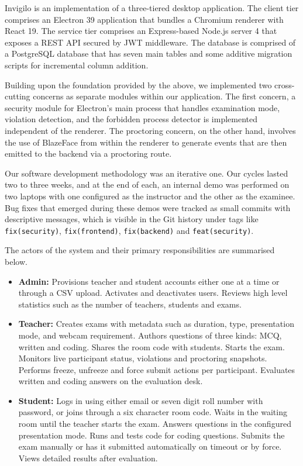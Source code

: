 \documentclass[12pt, a4paper]{report}
\begin{document}
\begin{justify}
  {\fontsize{12}{18}\selectfont
    Invigilo is an implementation of a three-tiered desktop application. The client tier comprises an Electron 39 application that bundles a Chromium renderer with React 19. The service tier comprises an Express-based Node.js server 4 that exposes a REST API secured by JWT middleware. The database is comprised of a PostgreSQL database that has seven main tables and some additive migration scripts for incremental column addition.

    Building upon the foundation provided by the above, we implemented two cross-cutting concerns as separate modules within our application. The first concern, a security module for Electron’s main process that handles examination mode, violation detection, and the forbidden process detector is implemented independent of the renderer. The proctoring concern, on the other hand, involves the use of BlazeFace from within the renderer to generate events that are then emitted to the backend via a proctoring route.

    Our software development methodology was an iterative one. Our cycles lasted two to three weeks, and at the end of each, an internal demo was performed on two laptops with one configured as the instructor and the other as the examinee. Bug fixes that emerged during these demos were tracked as small commits with descriptive messages, which is visible in the Git history under tags like \texttt{fix(security)}, \texttt{fix(frontend)}, \texttt{fix(backend)} and \texttt{feat(security)}.

    The actors of the system and their primary responsibilities are summarised below.

    \begin{itemize}
        \item \textbf{Admin:} Provisions teacher and student accounts either one at a time or through a CSV upload. Activates and deactivates users. Reviews high level statistics such as the number of teachers, students and exams.
        \item \textbf{Teacher:} Creates exams with metadata such as duration, type, presentation mode, and webcam requirement. Authors questions of three kinds: MCQ, written and coding. Shares the room code with students. Starts the exam. Monitors live participant status, violations and proctoring snapshots. Performs freeze, unfreeze and force submit actions per participant. Evaluates written and coding answers on the evaluation desk.
        \item \textbf{Student:} Logs in using either email or seven digit roll number with password, or joins through a six character room code. Waits in the waiting room until the teacher starts the exam. Answers questions in the configured presentation mode. Runs and tests code for coding questions. Submits the exam manually or has it submitted automatically on timeout or by force. Views detailed results after evaluation.
    \end{itemize}
  }
\end{justify}
\end{document}
